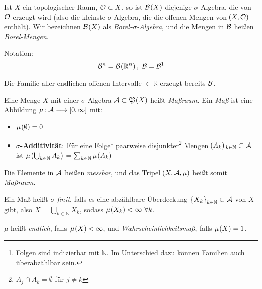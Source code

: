 \documentclass[skript.tex]{subfiles}
\begin{document}
	\begin{defin}
		Ist $X$ ein topologischer Raum, $\mathcal{O}\subset X$, so ist $\mc{B}\pr{X}$ diejenige $\sigma$-Algebra, die von $\mathcal{O}$ erzeugt wird (also die kleinste $\sigma$-Algebra, die die offenen Mengen von $\pr{X,\mc{O}}$ enthält). Wir bezeichnen $\mc{B}\pr{X}$ als \textit{Borel-$\sigma$-Algebra}, und die Mengen in $\mathcal{B}$ heißen \textit{Borel-Mengen}.
		
		Notation:
		\begin{equation*}
			\mc{B}^n = \mc{B}\pr{\mathbb{R}^n},\ \mc{B} = \mc{B}^1
		\end{equation*}
	\end{defin}

	\begin{bem*}
		Die Familie aller endlichen offenen Intervalle $\subset \mathbb{R}$ erzeugt bereits $\mathcal{B}$.
	\end{bem*}
	
	\begin{defin}
		Eine Menge $X$ mit einer $\sigma$-Algebra $\mc{A} \subset \mf{P}\pr{X}$ heißt \textit{Maßraum}. Ein \textit{Maß} ist eine Abbildung $\mu\colon \mathcal{A} \longrightarrow \left[ 0, \infty \right]$ mit:
		\begin{itemize}
			\item $\mu\pr{\emptyset} = 0$
			\item \textbf{\boldmath$\sigma$-Additivität}: Für eine Folge\footnote{Folgen sind indizierbar mit $\mathbb{N}$. Im Unterschied dazu können Familien auch überabzählbar sein.} paarweise disjunkter\footnote{$A_j \cap A_k = \emptyset$ für $j\neq k$} Mengen $\pr{A_k}_{k\in \mathbb{N}} \subset \mc{A}$ ist $\mu\pr{\bigcup_{k\in\mathbb{N}} A_k } = \sum_{k\in\mathbb{N}} \mu\pr{A_k}$
		\end{itemize}
		Die Elemente in $\mathcal{A}$ heißen \textit{messbar}, und das Tripel $\pr{X, \mc{A}, \mu}$ heißt somit \textit{Maßraum}.
	\end{defin}
	
	\begin{defin}
		Ein Maß heißt \textit{$\sigma$-finit}, falls es eine abzählbare Überdeckung $\left\{X_k\right\}_{k\in\mathbb{N}} \subset \mathcal{A}$ von $X$ gibt, also $X=\bigcup_{k\in\mathbb{N}} X_k$, sodass $\mu\pr{X_k} < \infty\ \forall k$.
		
		$\mu$ heißt \textit{endlich}, falls $\mu\pr{X}<\infty$, und \textit{Wahrscheinlichkeitsmaß}, falls $\mu\pr{X}=1$.
	\end{defin}
\end{document}
